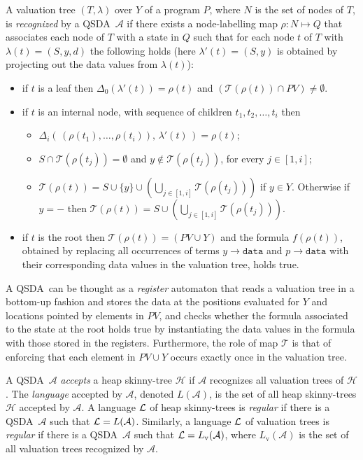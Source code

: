 \documentclass{llncs}
\newcommand{\A}{\mathcal{A}}
\newcommand{\Lval}{L_{\text{v}}}
\newcommand{\PV}{\mathit{PV}}
\newcommand{\data}{\texttt{data}}
\newcommand{\run}{\rho}\newcommand{\QSDA}{\mbox{\sc QSDA}}
\newcommand{\HC}{\mathcal{H}}
\begin{document}
A valuation tree $(T,\lambda)$ over $Y$ of a program $P$, where $N$ is the set of nodes of $T$, is {\em recognized}  by a \QSDA\ $\A$ if there exists a node-labelling map $\run:N\mapsto Q$ that associates each node of $T$ with a state in $Q$ such that for each node $t$ of $T$ with $\lambda(t)=(S,y,d)$ the following holds (here $\lambda'(t) = (S,y)$ is obtained by projecting out the data values from $\lambda(t)$):
\begin{itemize}
\item if $t$ is a leaf then $\Delta_0(\lambda'(t))=\run(t)$ and $(\mathcal{T}(\run(t))\cap \PV)\not=\emptyset$.

\item if $t$ is an internal node, with sequence of children $t_1,t_2, \ldots, t_i$ then
\begin{itemize}
\item $\Delta_i\left(\, (\run(t_1),\ldots, \run(t_i) ),\, \lambda'(t)\, \right)=\run(t)$;

 \item $S \cap \mathcal{T}(\run(t_j))=\emptyset$ and  $y\notin \mathcal{T}(\run(t_j))$, for every $j\in[1,i]$;
 \item $\mathcal{T}(\run(t))=S \cup \{y\} \cup \left(\bigcup_{j\in[1,i]} \mathcal{T}(\run(t_j))\right)$ if $y \in Y$. Otherwise if $y = -$ then $\mathcal{T}(\run(t))=S \cup \left(\bigcup_{j\in[1,i]} \mathcal{T}(\run(t_j))\right)$.

\end{itemize}
\item if $t$ is the root then $\mathcal{T}(\run(t))=(\PV\cup Y)$ and the formula $f(\run(t))$, obtained by replacing all occurrences of terms $y \rightarrow \data$ and $p \rightarrow \data$ with their corresponding data values in the valuation tree,
holds true.

\end{itemize}


A \QSDA\ can be thought as a \emph{register} automaton that reads a valuation tree in a bottom-up fashion and stores the data at the positions evaluated for $Y$ and locations pointed by elements in $\PV$, and checks whether the formula associated to the state at the root  holds true by instantiating the data values in the formula with those stored in the registers. Furthermore, the role of  map $\mathcal{T}$ is that of enforcing that each element in $\PV\cup Y$ occurs exactly once in the valuation tree.

A \QSDA\ $\A$ {\em accepts} a heap skinny-tree $\HC$ if $\A$ recognizes all valuation trees of $\HC$. The {\em language} accepted by $\A$, denoted $L(\A)$, is the set of all heap skinny-trees $\HC$ accepted by $\A$. A language $\cal L$ of heap skinny-trees is {\em regular} if there is a \QSDA\ $\A$ such that ${\cal L}=L(\A)$.
Similarly, a language $\cal L$ of valuation trees is {\em regular} if there is a \QSDA\ $\A$ such that ${\cal L}=\Lval(\A)$, where $\Lval(\A)$ is the set of all valuation trees recognized by $\A$.
\end{document}
